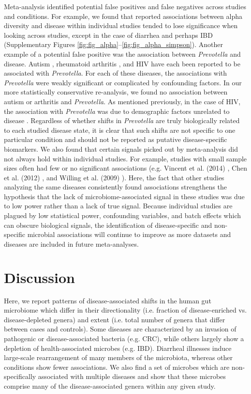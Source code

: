 Meta-analysis identified potential false positives and false negatives across studies and conditions.
For example, we found that reported associations between alpha diversity and disease within individual studies tended to lose significance when looking across studies, except in the case of diarrhea and perhaps IBD (Supplementary Figures \ref{fig:fig_alpha}--\ref{fig:fig_alpha_simpson}).
Another example of a potential false positive was the association between \textit{Prevotella} and disease.
Autism \cite{asd-kb}, rheumatoid arthritis \cite{ra-littman}, and HIV \cite{lozupone2013alterations,hiv-dinh} have each been reported to be associated with \textit{Prevotella}. For each of these diseases, the associations with \textit{Prevotella} were weakly significant or complicated by confounding factors.
In our more statistically conservative re-analysis, we found no association between autism or arthritis and \textit{Prevotella}.
As mentioned previously, in the case of HIV, the association with \textit{Prevotella} was due to demographic factors unrelated to disease \cite{noguera2016gut}.
Regardless of whether shifts in \textit{Prevotella} are truly biologically related to each studied disease state, it is clear that such shifts are not specific to one particular condition and should not be reported as putative disease-specific biomarkers.
We also found that certain signals picked out by meta-analysis did not always hold within individual studies.
For example, studies with small sample sizes often had few or no significant associations (e.g. Vincent et al. (2014) \cite{cdi-vincent}, Chen et al. (2012) \cite{crc-xiang}, and Willing et al. (2009) \cite{ibd-engstrand}).
Here, the fact that other studies analyzing the same diseases consistently found associations strengthens the hypothesis that the lack of microbiome-associated signal in these studies was due to low power rather than a lack of true signal.
Because individual studies are plagued by low statistical power, confounding variables, and batch effects which can obscure biological signals, the identification of disease-specific and non-specific microbial associations will continue to improve as more datasets and diseases are included in future meta-analyses.


\section{Discussion}

Here, we report patterns of disease-associated shifts in the human gut microbiome which differ in their directionality (i.e. fraction of disease-enriched vs. disease-depleted genera) and extent (i.e. total number of genera that differ between cases and controls).
Some diseases are characterized by an invasion of pathogenic or disease-associated bacteria (e.g. CRC), while others largely show a depletion of health-associated microbes (e.g. IBD).
Diarrheal illnesses induce large-scale rearrangement of many members of the microbiota, whereas other conditions show fewer associations.
We also find a set of microbes which are non-specifically associated with multiple diseases and show that these microbes comprise many of the disease-associated genera within any given study.

